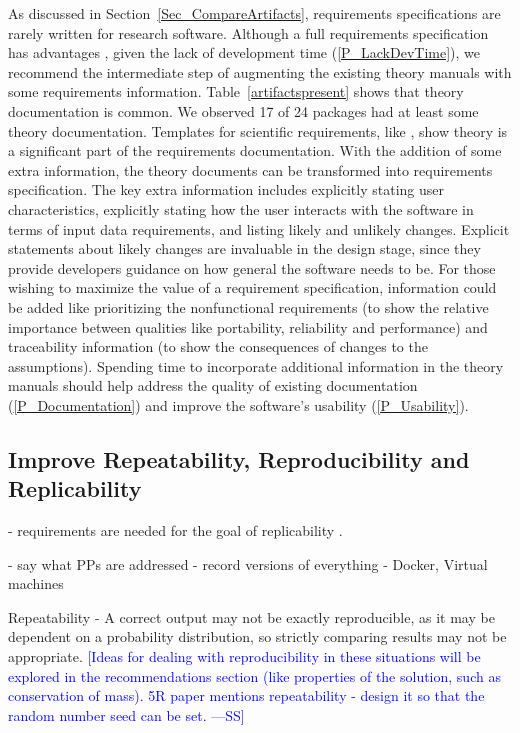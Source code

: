\documentclass[final, 3p, times, authoryear]{elsarticle}
\newcommand{\authornote}[3]{\textcolor{#1}{[#3 ---#2]}}
\newcommand{\authornote}[3]{}
\newcommand{\wss}[1]{\authornote{blue}{SS}{#1}} %
\begin{document}
As discussed in Section~\ref{Sec_CompareArtifacts}, requirements specifications
are rarely written for research software. Although a full requirements
specification has advantages \citep{SmithEtAl2007, SmithAndLai2005},
given the lack of development time (\ref{P_LackDevTime}), we recommend the
intermediate step of augmenting the existing theory manuals with some
requirements information.  Table~\ref{artifactspresent} shows that theory
documentation is common.  We observed 17 of 24 packages had at least some theory
documentation. Templates for scientific requirements, like \citet{SmithEtAl2007,
SmithAndLai2005}, show theory is a significant part of the requirements
documentation. With the addition of some extra information, the theory documents
can be transformed into requirements specification.  The key extra information
includes explicitly stating user characteristics, explicitly stating how the
user interacts with the software in terms of input data requirements, and
listing likely and unlikely changes.  Explicit statements about likely changes
are invaluable in the design stage, since they provide developers guidance on
how general the software needs to be.  For those wishing to maximize the value
of a requirement specification, information could be added like prioritizing the
nonfunctional requirements (to show the relative importance between qualities
like portability, reliability and performance) and traceability information (to
show the consequences of changes to the assumptions). Spending time to
incorporate additional information in the theory manuals should help address the
quality of existing documentation (\ref{P_Documentation})  and improve the
software's usability (\ref{P_Usability}).

\subsection{Improve Repeatability, Reproducibility and Replicability}

- requirements are needed for the goal of replicability
\citep{BenureauAndRougier2017}.

- say what PPs are addressed
- record versions of everything
- Docker, Virtual machines

Repeatability - A correct output may not be exactly reproducible, as it may be
dependent on a probability distribution, so strictly comparing results may not
be appropriate. \wss{Ideas for dealing with reproducibility in these situations
will be explored in the recommendations section (like properties of the
solution, such as conservation of mass).  5R paper mentions repeatability -
design it so that the random number seed can be set.}
\end{document}

